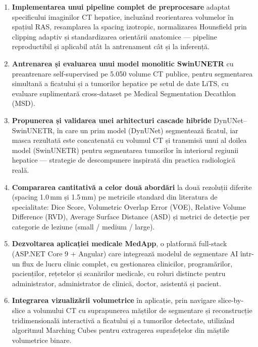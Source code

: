 \documentclass[12pt, a4paper]{report}
\begin{document}
\begin{enumerate}

    \item \textbf{Implementarea unui pipeline complet de preprocesare}
    adaptat specificului imaginilor CT hepatice, incluzând
    reorientarea volumelor în spațiul RAS, resamplarea la spacing
    izotropic, normalizarea Hounsfield prin clipping adaptiv și
    standardizarea orientării anatomice — pipeline reproductibil
    și aplicabil atât la antrenament cât și la inferență.

    \item \textbf{Antrenarea și evaluarea unui model monolitic
    SwinUNETR} cu preantrenare self-supervised pe 5.050 volume CT
    publice, pentru segmentarea simultană a ficatului și a tumorilor
    hepatice pe setul de date LiTS, cu evaluare suplimentară
    cross-dataset pe Medical Segmentation Decathlon (MSD).

    \item \textbf{Propunerea și validarea unei arhitecturi cascade
    hibride} DynUNet–SwinUNETR, în care un prim model (DynUNet)
    segmentează ficatul, iar masca rezultată este concatenată cu
    volumul CT și transmisă unui al doilea model (SwinUNETR) pentru
    segmentarea tumorilor în interiorul regiunii hepatice — strategie
    de descompunere inspirată din practica radiologică reală.

    \item \textbf{Compararea cantitativă a celor două abordări}
    la două rezoluții diferite (spacing 1.0\,mm și 1.5\,mm) pe
    metricile standard din literatura de specialitate: Dice Score,
    Volumetric Overlap Error (VOE), Relative Volume Difference
    (RVD), Average Surface Distance (ASD) și metrici de detecție
    per categorie de leziune (small / medium / large).

    \item \textbf{Dezvoltarea aplicației medicale MedApp}, o
    platformă full-stack (ASP.NET Core 9 + Angular) care integrează
    modelul de segmentare AI într-un flux de lucru clinic complet,
    cu gestionarea clinicilor, programărilor, pacienților, rețetelor
    și scanărilor medicale, cu roluri distincte pentru administrator,
    administrator de clinică, doctor, asistentă și pacient.

    \item \textbf{Integrarea vizualizării volumetrice} în aplicație,
    prin navigare slice-by-slice a volumului CT cu suprapunerea
    măștilor de segmentare și reconstrucție tridimensională
    interactivă a ficatului și a tumorilor detectate, utilizând
    algoritmul Marching Cubes pentru extragerea suprafețelor din
    măștile volumetrice binare.

\end{enumerate}
\end{document}

